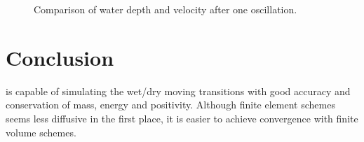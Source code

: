 \begin{figure}[H]
\begin{minipage}[t]{0.5\textwidth}
 \centering
\end{minipage}%
\begin{minipage}[t]{0.5\textwidth}
 \centering
\end{minipage}
\begin{minipage}[t]{0.5\textwidth}
 \centering
\end{minipage}%
\begin{minipage}[t]{0.5\textwidth}
 \centering
\end{minipage}
  \caption{Comparison of water depth and velocity after one oscillation.}
  \label{fig:thacker2:SLU_comparison2}
\end{figure}

\section{Conclusion}
 is capable of simulating the wet/dry moving transitions with good
accuracy and conservation of mass, energy and positivity. Although finite element schemes 
seems less diffusive in the first place, it is easier to achieve convergence with 
finite volume schemes. 



